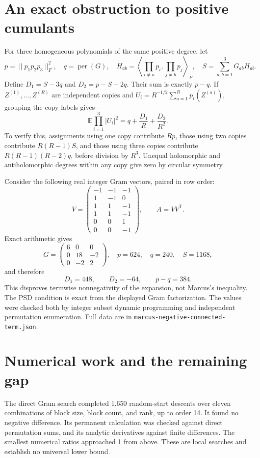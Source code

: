 \documentclass[11pt]{article}
\newcommand{\per}{\operatorname{per}}
\begin{document}
\section{An exact obstruction to positive cumulants}
For three homogeneous polynomials of the same positive degree, let
\[
 p=\|p_1p_2p_3\|_F^2,\quad q=\per(G),\quad
 H_{ab}=\left\langle\prod_{i\ne a}p_i,\prod_{j\ne b}p_j\right\rangle_F,
 \quad S=\sum_{a,b=1}^3G_{ab}H_{ab}.
\]
Define $D_1=S-3q$ and $D_2=p-S+2q$. Their sum is exactly $p-q$.
If $Z^{(1)},\ldots,Z^{(R)}$ are independent copies and
$U_i=R^{-1/2}\sum_{a=1}^R p_i(Z^{(a)})$, grouping the copy labels gives
\begin{equation}\label{replica}
 \mathbb E\prod_{i=1}^3|U_i|^2
  =q+\frac{D_1}{R}+\frac{D_2}{R^2}.
\end{equation}
To verify this, assignments using one copy contribute $Rp$, those using
two copies contribute $R(R-1)S$, and those using three copies contribute
$R(R-1)(R-2)q$, before division by $R^3$. Unequal holomorphic and
antiholomorphic degrees within any copy give zero by circular symmetry.

Consider the following real integer Gram vectors, paired in row order:
\[
 V=\begin{pmatrix}
 -1&-1&-1\\1&-1&0\\1&1&-1\\1&1&-1\\0&0&1\\0&0&-1
 \end{pmatrix},\qquad A=VV^{\mathsf T}.
\]
Exact arithmetic gives
\[
 G=\begin{pmatrix}6&0&0\\0&18&-2\\0&-2&2\end{pmatrix},\quad
 p=624,\quad q=240,\quad S=1168,
\]
and therefore
\[
 D_1=448,\qquad D_2=-64,\qquad p-q=384.
\]
This disproves termwise nonnegativity of the expansion, not Marcus's
inequality. The PSD condition is exact from the displayed Gram factorization.
The values were checked both by integer subset dynamic programming and
independent permutation enumeration. Full data are in
\texttt{marcus-negative-connected-term.json}.

\section{Numerical work and the remaining gap}
The direct Gram search completed 1,650 random-start descents over eleven
combinations of block size, block count, and rank, up to order 14. It found
no negative difference. Its permanent calculation was checked against direct
permutation sums, and its analytic derivatives against finite differences.
The smallest numerical ratios approached 1 from above. These are local
searches and establish no universal lower bound.
\end{document}
